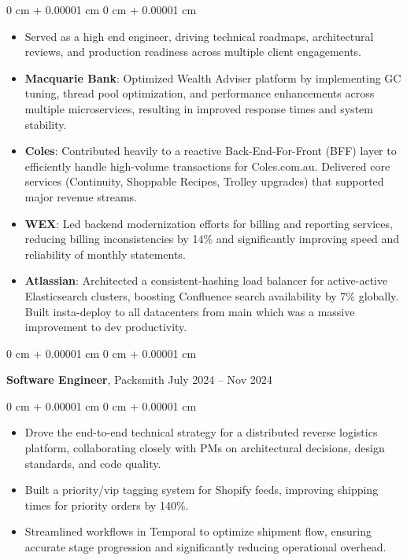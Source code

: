 \documentclass[10pt, letterpaper]{article}
\newenvironment{highlights}{
    \begin{itemize}[
        topsep=0.10 cm,
        parsep=0.10 cm,
        partopsep=0pt,
        itemsep=0pt,
        leftmargin=0 cm + 10pt
    ]
}{
    \end{itemize}
} %
\newenvironment{onecolentry}{
    \begin{adjustwidth}{
        0 cm + 0.00001 cm
    }{
        0 cm + 0.00001 cm
    }
}{
    \end{adjustwidth}
} %
\newenvironment{twocolentry}[2][]{
    \onecolentry
    \def\secondColumn{#2}
    \setcolumnwidth{\fill, 4.5 cm}
    \begin{paracol}{2}
}{
    \switchcolumn \raggedleft \secondColumn
    \end{paracol}
    \endonecolentry
} %
\begin{document}
        \vspace{0.10 cm}
        \begin{onecolentry}
            \begin{highlights}
                \item Served as a high end engineer, driving technical roadmaps, architectural reviews, and production readiness across multiple client engagements.
                \item \textbf{Macquarie Bank}: Optimized Wealth Adviser platform by implementing GC tuning, thread pool optimization, and performance enhancements across multiple microservices, resulting in improved response times and system stability.
                \item \textbf{Coles}: Contributed heavily to a reactive Back-End-For-Front (BFF) layer to efficiently handle high-volume transactions for Coles.com.au. Delivered core services (Continuity, Shoppable Recipes, Trolley upgrades) that supported major revenue streams.
                \item \textbf{WEX}: Led backend modernization efforts for billing and reporting services, reducing billing inconsistencies by 14\% and significantly improving speed and reliability of monthly statements.
                \item \textbf{Atlassian}: Architected a consistent-hashing load balancer for active-active Elasticsearch clusters, boosting Confluence search availability by 7\% globally. Built insta-deploy to all datacenters from main which was a massive improvement to dev productivity.
            \end{highlights}
        \end{onecolentry}

        \vspace{0.15 cm}
        \begin{twocolentry}{
            July 2024 – Nov 2024
        }
            \textbf{Software Engineer}, Packsmith\end{twocolentry}

        \vspace{0.10 cm}
        \begin{onecolentry}
            \begin{highlights}
                \item Drove the end-to-end technical strategy for a distributed reverse logistics platform, collaborating closely with PMs on architectural decisions, design standards, and code quality.
                \item Built a priority/vip tagging system for Shopify feeds, improving shipping times for priority orders by 140\%.
                \item Streamlined workflows in Temporal to optimize shipment flow, ensuring accurate stage progression and significantly reducing operational overhead.
            \end{highlights}
        \end{onecolentry}
        
\end{document}
